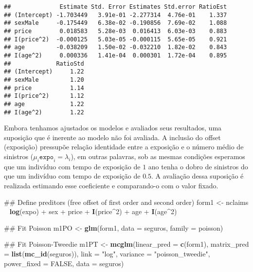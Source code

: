 \documentclass[9pt,a5paper,]{book}
\newenvironment{Shaded}{}{}
\newcommand{\KeywordTok}[1]{\textbf{{#1}}}
\newcommand{\DataTypeTok}[1]{\underline{{#1}}}
\newcommand{\DecValTok}[1]{{#1}}
\newcommand{\StringTok}[1]{{#1}}
\newcommand{\OtherTok}[1]{{#1}}
\newcommand{\NormalTok}[1]{{#1}}
\renewenvironment{Shaded}{\color{inputcolor}}{}
\renewcommand{\DataTypeTok}[1]{{#1}}
\theoremstyle{definition}
\theoremstyle{definition}
\theoremstyle{remark}
\begin{document}
\begin{verbatim}
##              Estimate Std. Error Estimates Std.error RatioEst
## (Intercept) -1.703449   3.91e-01 -2.277314  4.76e-01    1.337
## sexMale     -0.175449   6.38e-02 -0.190856  7.69e-02    1.088
## price        0.018583   5.28e-03  0.016413  6.03e-03    0.883
## I(price^2)  -0.000125   5.03e-05 -0.000115  5.65e-05    0.921
## age         -0.038209   1.50e-02 -0.032210  1.82e-02    0.843
## I(age^2)     0.000336   1.41e-04  0.000301  1.72e-04    0.895
##             RatioStd
## (Intercept)     1.22
## sexMale         1.20
## price           1.14
## I(price^2)      1.12
## age             1.22
## I(age^2)        1.22
\end{verbatim}

Embora tenhamos ajustados os modelos e avaliados seus resultados, uma
suposição que é inerente ao modelo não foi avaliada. A inclusão do
offset (exposição) pressupõe relação identidade entre a exposição e o
número médio de sinistros (\(\mu_i \texttt{expo}_i = \lambda_i\)), em
outras palavras, sob as mesmas condições esperamos que um indivíduo com
tempo de exposição de \(1\) ano tenha o dobro de sinistros do que um
indivíduo com tempo de exposição de \(0.5\). A avaliação dessa suposição
é realizada estimando esse coeficiente e comparando-o com o valor
fixado.

\begin{Shaded}
\begin{Highlighting}[]
\NormalTok{## Define preditors (free offset of first order and second order)}
\NormalTok{form1 <-}\StringTok{ }\NormalTok{nclaims ~}\StringTok{ }\KeywordTok{log}\NormalTok{(expo) +}\StringTok{ }\NormalTok{sex +}
\StringTok{    }\NormalTok{price +}\StringTok{ }\KeywordTok{I}\NormalTok{(price^}\DecValTok{2}\NormalTok{) +}\StringTok{ }\NormalTok{age +}\StringTok{ }\KeywordTok{I}\NormalTok{(age^}\DecValTok{2}\NormalTok{)}

\NormalTok{## Fit Poisson}
\NormalTok{m1PO <-}\StringTok{ }\KeywordTok{glm}\NormalTok{(form1, }\DataTypeTok{data =} \NormalTok{seguros, }\DataTypeTok{family =} \NormalTok{poisson)}

\NormalTok{## Fit Poisson-Tweedie}
\NormalTok{m1PT <-}\StringTok{ }\KeywordTok{mcglm}\NormalTok{(}\DataTypeTok{linear_pred =} \KeywordTok{c}\NormalTok{(form1),}
          \DataTypeTok{matrix_pred =} \KeywordTok{list}\NormalTok{(}\KeywordTok{mc_id}\NormalTok{(seguros)),}
          \DataTypeTok{link =} \StringTok{"log"}\NormalTok{,}
          \DataTypeTok{variance =} \StringTok{"poisson_tweedie"}\NormalTok{,}
          \DataTypeTok{power_fixed =} \OtherTok{FALSE}\NormalTok{,}
          \DataTypeTok{data =} \NormalTok{seguros)}
\end{Highlighting}
\end{Shaded}
\end{document}
